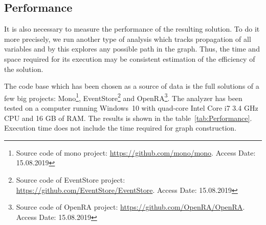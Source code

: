 \subsection{Performance}

It is also necessary to measure the performance of the resulting solution.
To do it more precisely, we run another type of analysis which tracks propagation of all variables and by this explores any possible path in the graph.
Thus, the time and space required for its execution may be consistent estimation of the efficiency of the solution.

The code base which has been chosen as a source of data is the full solutions of a few big projects: Mono\footnote{Source code of mono project: \url{https://github.com/mono/mono}. Access Date: 15.08.2019}, EventStore\footnote{Source code of EventStore project: \url{https://github.com/EventStore/EventStore}. Access Date: 15.08.2019} and OpenRA\footnote{Source code of OpenRA project: \url{https://github.com/OpenRA/OpenRA}. Access Date: 15.08.2019}.
The analyzer has been tested on a computer running Windows~10 with quad-core Intel Core i7 3.4 GHz CPU and 16 GB of RAM.
The results is shown in the table~\ref{tab:Performance}.
Execution time does not include the time required for graph construction.
%

